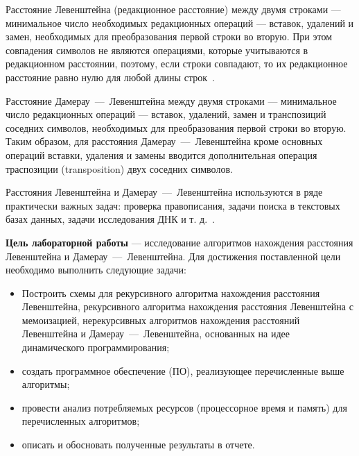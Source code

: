 
Расстояние Левенштейна (редакционное расстояние) между двумя строками --- минимальное число необходимых редакционных операций --- вставок, удалений и замен, необходимых для преобразования первой строки во вторую. При этом совпадения символов не являются операциями, которые учитываются в
редакционном расстоянии, поэтому, если строки совпадают, то их редакционное
расстояние равно нулю для любой длины строк~\cite{ulianov}. 

Расстояние Дамерау~---~Левенштейна между двумя строками --- минимальное число редакционных операций --- вставок, удалений, замен и транспозиций соседних символов, необходимых для преобразования первой строки во вторую. Таким образом, для расстояния Дамерау~---~Левенштейна кроме основных операций вставки, удаления и замены вводится дополнительная операция траспозиции (transposition) двух соседних символов.

Расстояния Левенштейна и Дамерау~---~Левенштейна используются в ряде практически важных задач: проверка правописания, задачи поиска в текстовых базах данных, задачи исследования ДНК и т. д.~\cite{ulianov}.

\textbf{Цель лабораторной работы} --- исследование алгоритмов нахождения расстояния Левенштейна и Дамерау~---~Левенштейна. Для достижения поставленной цели необходимо выполнить следующие задачи:

\begin{itemize}
\item Построить схемы для рекурсивного алгоритма нахождения расстояния Левенштейна, рекурсивного алгоритма нахождения расстояния Левенштейна с мемоизацией, нерекурсивных алгоритмов нахождения расстояний Левенштейна и Дамерау~---~Левенштейна, основанных на идее динамического программирования;
\item создать программное обеспечение (ПО), реализующее перечисленные выше алгоритмы;
\item провести анализ потребляемых ресурсов (процессорное время и память) для перечисленных алгоритмов;
\item описать и обосновать полученные результаты в отчете.
\end{itemize}
